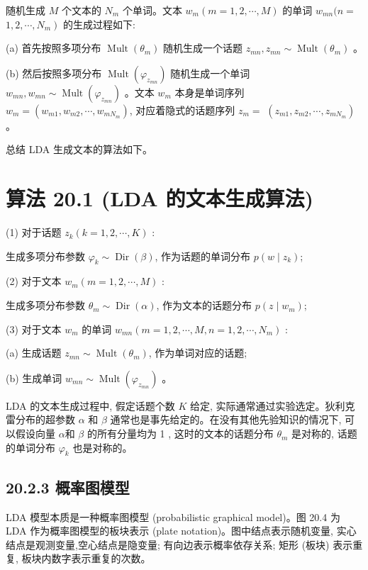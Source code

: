 \documentclass[10pt]{article}
\begin{document}
\begin{CJK*}{UTF8}{bsmi}
随机生成 $M$ 个文本的 $N_{m}$ 个单词。文本 $w_{m}(m=1,2, \cdots, M)$ 的单词 $w_{m n}(n=$ $\left.1,2, \cdots, N_{m}\right)$ 的生成过程如下:

(a) 首先按照多项分布 $\operatorname{Mult}\left(\theta_{m}\right)$ 随机生成一个话题 $z_{m n}, z_{m n} \sim \operatorname{Mult}\left(\theta_{m}\right)$ 。

(b) 然后按照多项分布 $\operatorname{Mult}\left(\varphi_{z_{m n}}\right)$ 随机生成一个单词 $w_{m n}, w_{m n} \sim \operatorname{Mult}\left(\varphi_{z_{m n}}\right)$ 。文本 $w_{m}$ 本身是单词序列 $w_{m}=\left(w_{m 1}, w_{m 2}, \cdots, w_{m N_{m}}\right)$, 对应着隐式的话题序列 $z_{m}=$ $\left(z_{m 1}, z_{m 2}, \cdots, z_{m N_{m}}\right)$ 。

总结 LDA 生成文本的算法如下。

\section*{算法 20.1 (LDA 的文本生成算法)}
(1) 对于话题 $z_{k}(k=1,2, \cdots, K)$ :

生成多项分布参数 $\varphi_{k} \sim \operatorname{Dir}(\beta)$, 作为话题的单词分布 $p\left(w \mid z_{k}\right)$;

(2) 对于文本 $w_{m}(m=1,2, \cdots, M)$ :

生成多项分布参数 $\theta_{m} \sim \operatorname{Dir}(\alpha)$, 作为文本的话题分布 $p\left(z \mid w_{m}\right)$;

(3) 对于文本 $w_{m}$ 的单词 $w_{m n}\left(m=1,2, \cdots, M, n=1,2, \cdots, N_{m}\right)$ :

(a) 生成话题 $z_{m n} \sim \operatorname{Mult}\left(\theta_{m}\right)$, 作为单词对应的话题;

(b) 生成单词 $w_{m n} \sim \operatorname{Mult}\left(\varphi_{z_{m n}}\right)$ 。

LDA 的文本生成过程中, 假定话题个数 $K$ 给定, 实际通常通过实验选定。狄利克雷分布的超参数 $\alpha$ 和 $\beta$ 通常也是事先给定的。在没有其他先验知识的情况下, 可以假设向量 $\alpha$和 $\beta$ 的所有分量均为 1 , 这时的文本的话题分布 $\theta_{m}$ 是对称的, 话题的单词分布 $\varphi_{k}$ 也是对称的。

\subsection*{20.2.3 概率图模型}
LDA 模型本质是一种概率图模型 (probabilistic graphical model)。图 20.4 为 LDA 作为概率图模型的板块表示 (plate notation)。图中结点表示随机变量, 实心结点是观测变量,空心结点是隐变量; 有向边表示概率依存关系; 矩形 (板块) 表示重复, 板块内数字表示重复的次数。


\end{CJK*}
\end{document}
